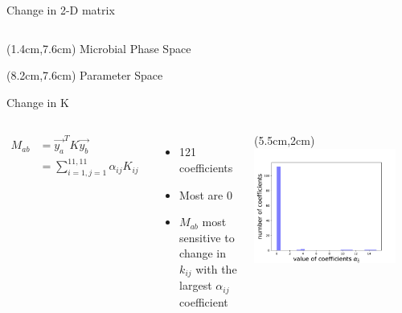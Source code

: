 \documentclass[15pt]{beamer}
\begin{document}
\begin{frame}{Change in 2-D matrix}
\begin{columns}
\begin{textblock*}{7.3cm}
	\end{textblock*}
\end{columns}
\begin{textblock*}{6cm}(1.4cm,7.6cm) %
Microbial Phase Space
\end{textblock*}
\begin{textblock*}{6cm}(8.2cm,7.6cm) %
Parameter Space
\end{textblock*}
\end{frame}

\begin{frame}{Change in K}
\begin{columns}
\begin{align*}
M_{ab} &= \vec{y_a}^T K \vec{y_b}\\
	   &= \sum_{i=1,j=1}^{11,11} \alpha_{ij}K_{ij}
\end{align*}

\begin{itemize}
	\item 121 coefficients
	\item Most are 0
	\item $M_{ab}$ most sensitive to change in $k_{ij}$ with the largest $\alpha_{ij}$ coefficient
\end{itemize}

	\begin{textblock*}{8cm}(5.5cm,2cm) %
	 \includegraphics[width=0.9\textwidth]{hist}
	\end{textblock*}
\end{columns}
\end{frame}
\end{document}
